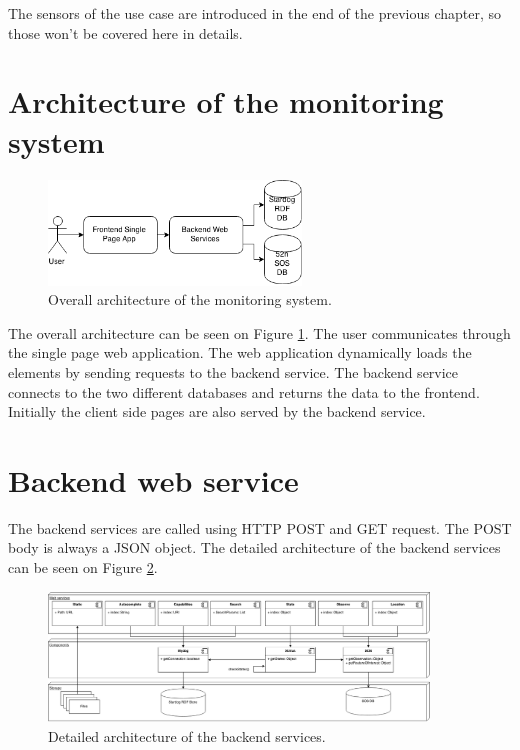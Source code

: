 The sensors of the use case are introduced in the end of the previous chapter, so those won't be covered here in details.
  
\section{Architecture of the monitoring system}

\begin{figure}[h]
\centering
\includegraphics[width=0.6\textwidth]{figures/softwareArch.png}
\caption{Overall architecture of the monitoring system.\label{fig:overallarch}}
\end{figure}

The overall architecture can be seen on Figure \ref{fig:overallarch}. The user communicates through the single page web application. The web application dynamically loads the elements by sending requests to the backend service. The backend service connects to the two different databases and returns the data to the frontend. Initially the client side pages are also served by the backend service. 

\section{Backend web service}

The backend services are called using HTTP POST and GET request. The POST body is always a JSON object. The detailed architecture of the backend services can be seen on Figure \ref{fig:backarch}.


\begin{figure}[h]
\centering
\includegraphics[width=0.9\textwidth]{figures/backendarch.png}
\caption{Detailed architecture of the backend services.\label{fig:backarch}}
\end{figure}

